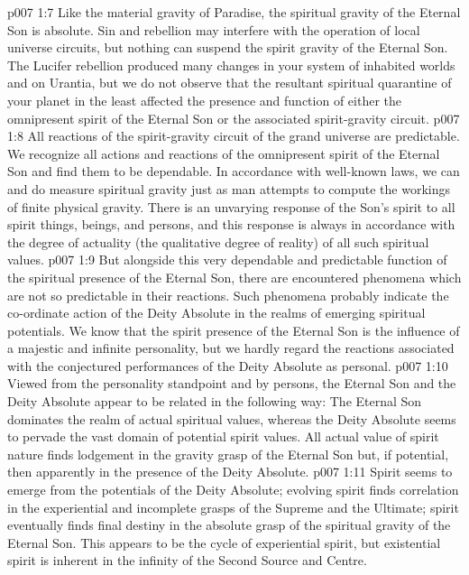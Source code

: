 \vs p007 1:7 \pc Like the material gravity of Paradise, the spiritual gravity of the Eternal Son is absolute. Sin and rebellion may interfere with the operation of local universe circuits, but nothing can suspend the spirit gravity of the Eternal Son. The Lucifer rebellion produced many changes in your system of inhabited worlds and on Urantia, but we do not observe that the resultant spiritual quarantine of your planet in the least affected the presence and function of either the omnipresent spirit of the Eternal Son or the associated spirit\hyp{}gravity circuit.
\vs p007 1:8 \pc All reactions of the spirit\hyp{}gravity circuit of the grand universe are predictable. We recognize all actions and reactions of the omnipresent spirit of the Eternal Son and find them to be dependable. In accordance with well\hyp{}known laws, we can and do measure spiritual gravity just as man attempts to compute the workings of finite physical gravity. There is an unvarying response of the Son’s spirit to all spirit things, beings, and persons, and this response is always in accordance with the degree of actuality (the qualitative degree of reality) of all such spiritual values.
\vs p007 1:9 But alongside this very dependable and predictable function of the spiritual presence of the Eternal Son, there are encountered phenomena which are not so predictable in their reactions. Such phenomena probably indicate the co\hyp{}ordinate action of the Deity Absolute in the realms of emerging spiritual potentials. We know that the spirit presence of the Eternal Son is the influence of a majestic and infinite personality, but we hardly regard the reactions associated with the conjectured performances of the Deity Absolute as personal.
\vs p007 1:10 \pc Viewed from the personality standpoint and by persons, the Eternal Son and the Deity Absolute appear to be related in the following way: The Eternal Son dominates the realm of actual spiritual values, whereas the Deity Absolute seems to pervade the vast domain of potential spirit values. All actual value of spirit nature finds lodgement in the gravity grasp of the Eternal Son but, if potential, then apparently in the presence of the Deity Absolute.
\vs p007 1:11 Spirit seems to emerge from the potentials of the Deity Absolute; evolving spirit finds correlation in the experiential and incomplete grasps of the Supreme and the Ultimate; spirit eventually finds final destiny in the absolute grasp of the spiritual gravity of the Eternal Son. This appears to be the cycle of experiential spirit, but existential spirit is inherent in the infinity of the Second Source and Centre.
